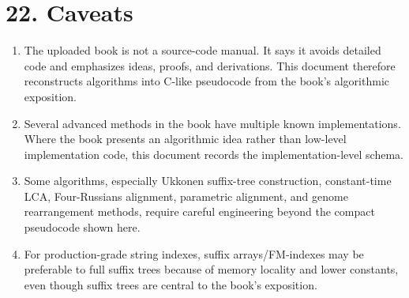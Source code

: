 \documentclass[11pt]{article}
\providecommand{\tightlist}{\setlength{\itemsep}{0pt}\setlength{\parskip}{0pt}}
\begin{document}
\section{22. Caveats}\label{caveats}

\begin{enumerate}
\def\labelenumi{\arabic{enumi}.}
\tightlist
\item
  The uploaded book is not a source-code manual. It says it avoids detailed code and emphasizes ideas, proofs, and derivations. This document therefore reconstructs algorithms into C-like pseudocode from the book's algorithmic exposition.
\item
  Several advanced methods in the book have multiple known implementations. Where the book presents an algorithmic idea rather than low-level implementation code, this document records the implementation-level schema.
\item
  Some algorithms, especially Ukkonen suffix-tree construction, constant-time LCA, Four-Russians alignment, parametric alignment, and genome rearrangement methods, require careful engineering beyond the compact pseudocode shown here.
\item
  For production-grade string indexes, suffix arrays/FM-indexes may be preferable to full suffix trees because of memory locality and lower constants, even though suffix trees are central to the book's exposition.
\end{enumerate}
\end{document}
